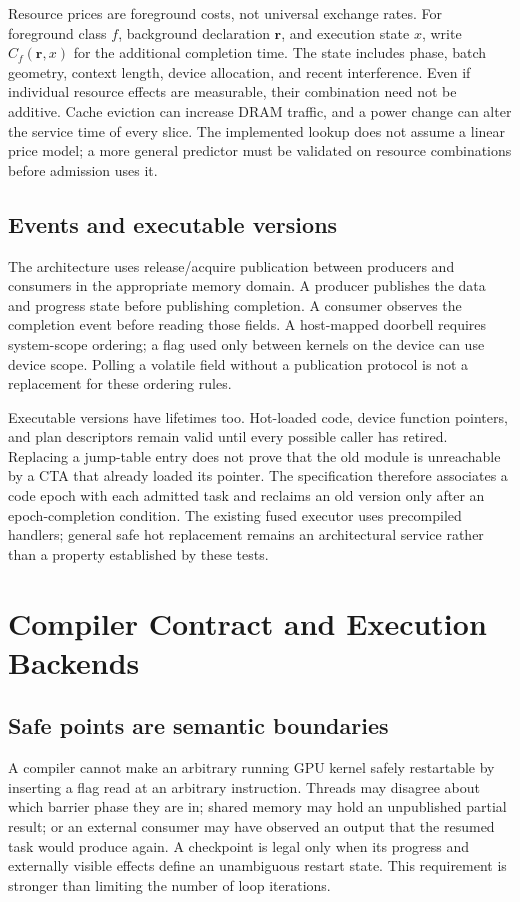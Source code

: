 Resource prices are foreground costs, not universal exchange rates. For
foreground class $f$, background declaration $\mathbf r$, and execution
state $x$, write $C_f(\mathbf r,x)$ for the additional completion time. The
state includes phase, batch geometry, context length, device allocation,
and recent interference. Even if individual resource effects are measurable,
their combination need not be additive. Cache eviction can increase DRAM
traffic, and a power change can alter the service time of every slice.
The implemented lookup does not assume a linear price model; a more general
predictor must be validated on resource combinations before admission uses it.

\subsection{Events and executable versions}
The architecture uses release/acquire publication between producers and
consumers in the appropriate memory domain. A producer publishes the data
and progress state before publishing completion. A consumer observes the
completion event before reading those fields. A host-mapped doorbell requires
system-scope ordering; a flag used only between kernels on the device can use
device scope. Polling a volatile field without a publication protocol is not
a replacement for these ordering rules.

Executable versions have lifetimes too. Hot-loaded code, device function
pointers, and plan descriptors remain valid until every possible caller has
retired. Replacing a jump-table entry does not prove that the old module is
unreachable by a CTA that already loaded its pointer. The specification
therefore associates a code epoch with each admitted task and reclaims an
old version only after an epoch-completion condition. The existing fused
executor uses precompiled handlers; general safe hot replacement remains
an architectural service rather than a property established by these tests.

\section{Compiler Contract and Execution Backends}
\label{sec:compiler}
\subsection{Safe points are semantic boundaries}
A compiler cannot make an arbitrary running GPU kernel safely restartable
by inserting a flag read at an arbitrary instruction. Threads may disagree
about which barrier phase they are in; shared memory may hold an unpublished
partial result; or an external consumer may have observed an output that
the resumed task would produce again. A checkpoint is legal only when its
progress and externally visible effects define an unambiguous restart state.
This requirement is stronger than limiting the number of loop iterations.

